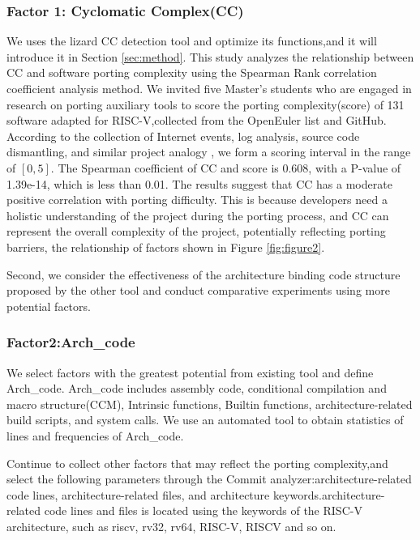 \documentclass[sigconf,screen,review,anonymous]{acmart}
\begin{document}
\subsubsection{Factor 1: Cyclomatic Complex(CC)}
\label{sec:factor-1}
We uses the lizard CC detection tool and optimize its functions,and it will introduce it in Section \ref{sec:method}.
This study analyzes the relationship between CC and software porting complexity using the Spearman Rank correlation coefficient analysis method.
We invited five Master's students who are engaged in research on porting auxiliary tools to score the porting complexity(score) of 131 software adapted for RISC-V,collected from the OpenEuler list\citep{stage2023} and GitHub.
According to the collection of Internet events, log analysis, source code dismantling, and similar project analogy \cite{liangguanyu2020}, we form a scoring interval in the range of $[0,5]$.
The Spearman coefficient of CC and score is 0.608, with a P-value of 1.39e-14, which is less than 0.01.
The results suggest that CC has a moderate positive correlation with porting difficulty.
This is because developers need a holistic understanding of the project during the porting process, and CC can represent the overall complexity of the project, potentially reflecting porting barriers, the relationship of factors shown in Figure \ref{fig:figure2}.




Second, we consider the effectiveness of the architecture binding code structure proposed by the other tool and conduct comparative experiments using more potential factors.
\subsubsection{Factor2:Arch\_code}

We select factors with the greatest potential from existing tool and define Arch\_code.
Arch\_code includes assembly code, conditional compilation and macro structure(CCM), Intrinsic functions, Builtin functions, architecture-related build scripts, and system calls.
We use an automated tool to obtain statistics of lines and frequencies of Arch\_code.

Continue to collect other factors that may reflect the porting complexity,and select the following parameters through the Commit analyzer:architecture-related code lines, architecture-related files, and architecture keywords.architecture-related code lines and files is located using the keywords of the RISC-V architecture, such as riscv, rv32, rv64, RISC-V, RISCV and so on.
\end{document}
